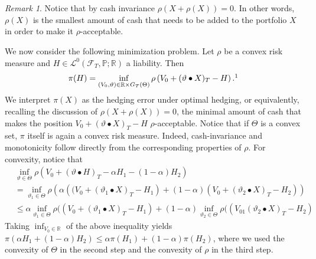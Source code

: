 \documentclass[11pt,a4paper,twoside,openany]{report}
\theoremstyle{plain} %
\theoremstyle{definition} %
\theoremstyle{remark} %
\newtheorem{remark}[remark]{Remark}
\begin{document}
\\\\
\begin{remark}\label{rem:minimal amound of injected cash for acceptable position}
    Notice that by cash invariance \(\rho(X+\rho(X))=0\). In other words, \(\rho(X)\) is the smallest amount of cash that needs to be added to the portfolio \(X\) in order to make it \(\rho\)-acceptable.
\end{remark} 
\bigbreak
We now consider the following minimization problem. Let \(\rho\) be a convex risk measure and \(H\in \mathcal{L}^0(\mathcal{F}_T,\mathbb{P};\mathbb{R})\) a liability. Then
\begin{equation}\label{eq:risk measure hedging}
    \pi(H) = \inf_{(V_0,\vartheta)\in\mathbb{R}\times G_T(\Theta)}\rho\left(V_0+(\vartheta\bullet X)_T-H\right).\footnotemark
\end{equation}
We interpret \(\pi(X)\) as the hedging error under optimal hedging, or equivalently, recalling the discussion of \(\rho(X+\rho(X))=0\), the minimal amount of cash that makes the position \(V_0+(\vartheta\bullet X)_T-H\) \(\rho\)-acceptable. Notice that if \(\Theta\) is a convex set, \(\pi\) itself is again a convex risk measure. Indeed, cash-invariance and monotonicity follow directly from the corresponding properties of \(\rho\). For convexity, notice that 
\begin{align*}
    &\inf_{\vartheta\in\Theta}\rho(V_0+(\vartheta\bullet H)_T-\alpha H_1-(1-\alpha) H_2)
    \\&=\inf_{\vartheta_1\in\Theta}\rho(\alpha\left( (V_0+(\vartheta_1\bullet X)_T-H_1\right)+(1-\alpha) \left(V_0+(\vartheta_2\bullet X)_T-H_2\right))
    \\&\leq \alpha\inf_{\vartheta_1\in\Theta}\rho( (V_0+(\vartheta_1\bullet X)_T-H_1)+(1-\alpha)\inf_{\vartheta_2\in\Theta}\rho( (V_01(\vartheta_2\bullet X)_T-H_2)
\end{align*}
Taking \(\inf_{V_0\in\mathbb{R}}\) of the above inequality yields \(\pi(\alpha H_1+(1-\alpha) H_2)\leq \alpha\pi(H_1)+(1-\alpha)\pi(H_2)\), where we used the convexity of \(\Theta\) in the second step and the convexity of \(\rho\) in the third step.
\end{document}
